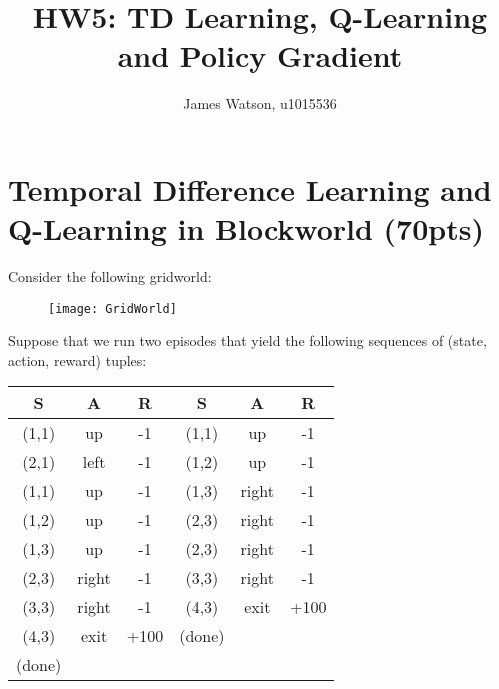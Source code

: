 \documentclass[fleqn]{hw5}
\title{HW5: TD Learning, Q-Learning and Policy Gradient}
\institute{University of Utah}
\author{James Watson, u1015536}
\begin{document}
\maketitle

\section{Temporal Difference Learning and Q-Learning in Blockworld (70pts)}

Consider the following gridworld:
\begin{figure}[h!]
  \centering
  \texttt{[image: GridWorld]}
\end{figure}

Suppose that we run two episodes that yield the
following sequences of (state, action, reward) tuples:

\begin{tabular}{ccc|ccc}
{\bf S} & {\bf A} & {\bf R} & {\bf S} & {\bf A} & {\bf R} \\
\hline
(1,1) & up    & -1     & (1,1) & up    & -1 \\
(2,1) & left  & -1     & (1,2) & up    & -1 \\
(1,1) & up    & -1     & (1,3) & right & -1 \\
(1,2) & up    & -1     & (2,3) & right & -1 \\
(1,3) & up    & -1     & (2,3) & right & -1 \\
(2,3) & right & -1     & (3,3) & right & -1 \\
(3,3) & right & -1     & (4,3) & exit  & +100 \\
(4,3) & exit  & +100   & (done)&       & \\
(done)&       &        &       &       & \\
\end{tabular}
\end{document}

